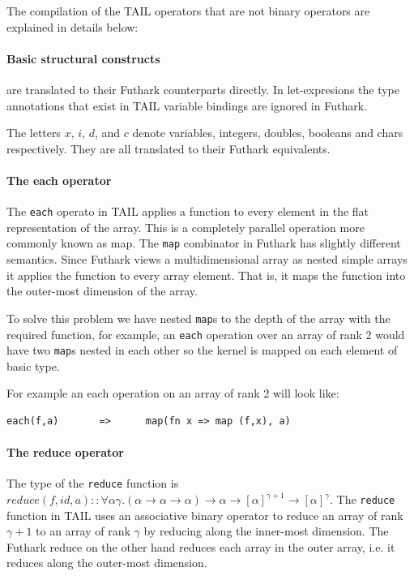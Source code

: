 \documentclass[11pt]{article}
\begin{document}
The compilation of the TAIL operators that are not binary operators are explained in details below:\\

\paragraph{Basic structural constructs} are translated to their Futhark counterparts directly.
In let-expresions the type annotations that exist in TAIL variable bindings are ignored in Futhark. 

The letters $x$, $i$, $d$, and $c$ denote variables, integers, doubles, booleans and chars respectively.
They are all translated to their Futhark equivalents.\\

\paragraph{The each operator} 
 
The {\tt each} operato in TAIL applies a function to every element in the flat representation of the array.
This is a completely parallel operation more commonly known as map.
The {\tt map} combinator in Futhark has slightly different semantics\cite{ElsmanDybdal:Array:2014}.
Since Futhark views a multidimensional array as nested simple arrays it applies the function to every array element.
That is, it maps the function into the outer-most dimension of the array\cite{TroelsHenriksen}.
 
To solve this problem we have nested {\tt map}s to the depth of the array with the required function,
for example, an {\tt each} operation over an array of rank 2 would have two {\tt map}s nested in each other so the kernel is
mapped on each element of basic type.
 
For example an each operation on an array of rank 2 will look like:
\begin{lstlisting}[numbers=none,frame=none]
each(f,a)       =>      map(fn x => map (f,x), a)
\end{lstlisting}
\paragraph{The reduce operator} 
The type of the {\tt reduce} function is $reduce(f,id,a) :: \forall\alpha\gamma.(\alpha \to \alpha \to \alpha) \to \alpha \to [\alpha]^{\gamma+1} \to [\alpha]^\gamma$.
The {\tt reduce} function in TAIL uses an associative binary operator to reduce an array of rank
$\gamma+1$ to an array of rank $\gamma$ by reducing along the inner-most dimension\cite{ElsmanDybdal:Array:2014}.
The Futhark reduce on the other hand reduces each array in the outer array, i.e. it reduces along the outer-most dimension\cite{TroelsHenriksen}.
 
\end{document}
